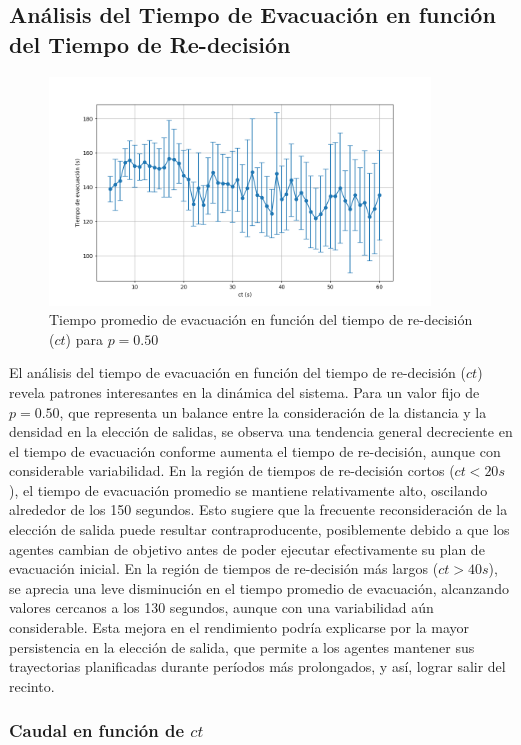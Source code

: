 \documentclass[12pt]{article}
\begin{document}
\subsection{Análisis del Tiempo de Evacuación en función del Tiempo de Re-decisión}
\begin{figure}[H]
\centering
\includegraphics[width=0.9\textwidth]{img/evacuation_times_p_0.5.png}
\caption{Tiempo promedio de evacuación en función del tiempo de re-decisión ($ct$) para $p=0.50$}
\label{fig:evac_time_ct}
\end{figure}
El análisis del tiempo de evacuación en función del tiempo de re-decisión ($ct$) revela patrones interesantes en la dinámica del sistema. Para un valor fijo de $p=0.50$, que representa un balance entre la consideración de la distancia y la densidad en la elección de salidas, se observa una tendencia general decreciente en el tiempo de evacuación conforme aumenta el tiempo de re-decisión, aunque con considerable variabilidad.
En la región de tiempos de re-decisión cortos ($ct < 20s$), el tiempo de evacuación promedio se mantiene relativamente alto, oscilando alrededor de los 150 segundos. Esto sugiere que la frecuente reconsideración de la elección de salida puede resultar contraproducente, posiblemente debido a que los agentes cambian de objetivo antes de poder ejecutar efectivamente su plan de evacuación inicial.
En la región de tiempos de re-decisión más largos ($ct > 40s$), se aprecia una leve disminución en el tiempo promedio de evacuación, alcanzando valores cercanos a los 130 segundos, aunque con una variabilidad aún considerable. Esta mejora en el rendimiento podría explicarse por la mayor persistencia en la elección de salida, que permite a los agentes mantener sus trayectorias planificadas durante períodos más prolongados, y así, lograr salir del recinto.

\subsubsection{Caudal en función de $ct$}
\end{document}
